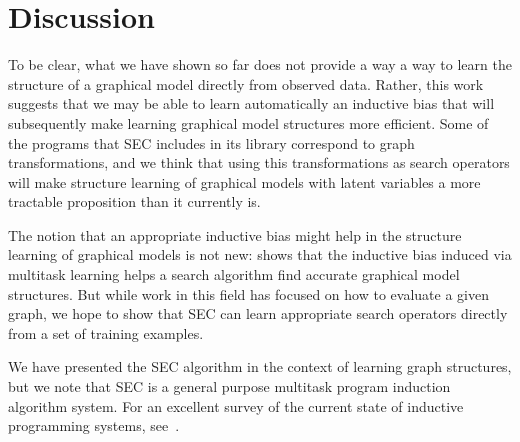 \documentclass{article} %
\begin{document}




\section{Discussion}

To be clear, what we have shown so far does not provide a way a way to learn the structure of a graphical model directly from observed data. Rather, this work suggests that we may be able to learn automatically an inductive bias that will subsequently make learning graphical model structures more efficient. Some of the programs that SEC includes in its library correspond to graph transformations, and we think that using this transformations as search operators will make structure learning of graphical models with latent variables a more tractable proposition than it currently is. 

The notion that an appropriate inductive bias might help in the structure learning of graphical models is not new: \citep{DBLP:conf/icml/HonorioS10} shows that the inductive bias induced via multitask learning helps a search algorithm find accurate graphical model structures. But while work in this field has focused on how to evaluate a given graph, we hope to show that SEC can learn appropriate search operators directly from a set of training examples. 

We have presented the SEC algorithm in the context of learning graph structures, but we note that SEC is a general purpose multitask program induction algorithm system. For an excellent survey of the current state of inductive programming systems, see~\citep{DBLP:conf/aaip/Kitzelmann09}. 



\end{document}
